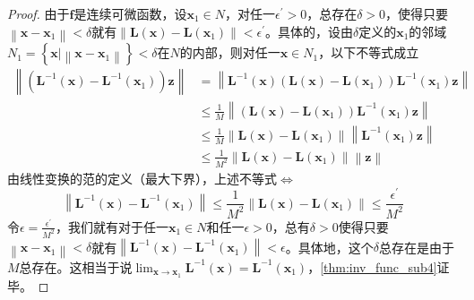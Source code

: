 \documentclass[main.tex]{subfiles}
\begin{document}
\begin{proof}
由于$\mathbf{f}$是连续可微函数，设$\mathbf{x}_1\in N$，对任一$\epsilon^\prime>0$，总存在$\delta>0$，使得只要$\left\|\mathbf{x}-\mathbf{x}_1\right\|<\delta$就有$\left\|\mathbf{L}\left(\mathbf{x}\right)-\mathbf{L}\left(\mathbf{x}_1\right)\right\|<\epsilon^\prime$。具体的，设由$\delta$定义的$\mathbf{x}_1$的邻域$N_1=\left\{\mathbf{x}|\left\|\mathbf{x}-\mathbf{x}_1\right\|\right\}<\delta$在$N$的内部，则对任一$\mathbf{x}\in N_1$，以下不等式成立
\begin{align*}
\left\|\left(\mathbf{L}^{-1}\left(\mathbf{x}\right)-\mathbf{L}^{-1}\left(\mathbf{x}_1\right)\right)\mathbf{z}\right\|&=\left\|\mathbf{L}^{-1}\left(\mathbf{x}\right)\left(\mathbf{L}\left(\mathbf{x}\right)-\mathbf{L}\left(\mathbf{x}_1\right)\right)\mathbf{L}^{-1}\left(\mathbf{x}_1\right)\mathbf{z}\right\|\\
&\leq\frac{1}{M}\left\|\left(\mathbf{L}\left(\mathbf{x}\right)-\mathbf{L}\left(\mathbf{x}_1\right)\right)\mathbf{L}^{-1}\left(\mathbf{x}_1\right)\mathbf{z}\right\|\\
&\leq\frac{1}{M}\left\|\mathbf{L}\left(\mathbf{x}\right)-\mathbf{L}\left(\mathbf{x}_1\right)\right\|\left\|\mathbf{L}^{-1}\left(\mathbf{x}_1\right)\mathbf{z}\right\|\\
&\leq\frac{1}{M^2}\left\|\mathbf{L}\left(\mathbf{x}\right)-\mathbf{L}\left(\mathbf{x}_1\right)\right\|\left\|\mathbf{z}\right\|
\end{align*}
由线性变换的范的定义（最大下界），上述不等式$\Leftrightarrow$
\[\left\|\mathbf{L}^{-1}\left(\mathbf{x}\right)-\mathbf{L}^{-1}\left(\mathbf{x}_1\right)\right\|\leq\frac{1}{M^2}\left\|\mathbf{L}\left(\mathbf{x}\right)-\mathbf{L}\left(\mathbf{x}_1\right)\right\|\leq\frac{\epsilon^\prime}{M^2}\]
令$\epsilon=\frac{\epsilon^\prime}{M^2}$，我们就有对于任一$\mathbf{x}_1\in N$和任一$\epsilon>0$，总有$\delta>0$使得只要$\left\|\mathbf{x}-\mathbf{x}_1\right\|<\delta$就有$\left\|\mathbf{L}^{-1}\left(\mathbf{x}\right)-\mathbf{L}^{-1}\left(\mathbf{x}_1\right)\right\|<\epsilon$。具体地，这个$\delta$总存在是由于$M$总存在。这相当于说$\lim_{\mathbf{x}\to\mathbf{x}_1}\mathbf{L}^{-1}\left(\mathbf{x}\right)=\mathbf{L}^{-1}\left(\mathbf{x}_1\right)$，\ref{thm:inv_func_sub4}证毕。
\end{proof}
\end{document}
